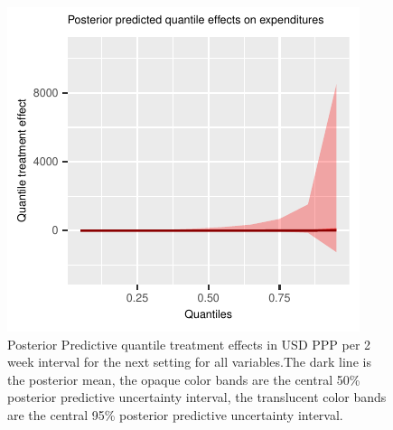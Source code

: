 \documentclass[AER]{AEA}
\begin{document}
\begin{figure}[h!]
        \includegraphics{posterior_predicted_quantile_TEs_expenditures_lognormal.pdf}
  \caption{ Posterior Predictive quantile treatment effects in USD PPP per 2 week interval for the next setting for all variables.The dark line is the posterior mean, the opaque color bands are the central 50\% posterior predictive uncertainty interval, the translucent color bands are the central 95\% posterior predictive uncertainty interval.}\label{posterior predicted quantiles}
\end{figure}

\clearpage
\end{document}
